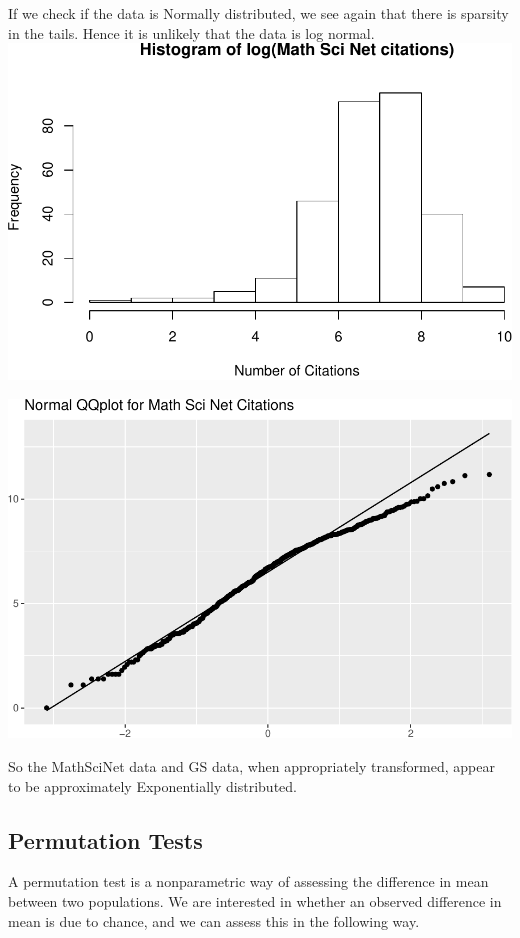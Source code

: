 \documentclass[]{article}
\begin{document}
If we check if the data is Normally distributed, we see again that there
is sparsity in the tails. Hence it is unlikely that the data is log
normal.
\includegraphics{final_files/figure-latex/unnamed-chunk-16-1.pdf}

\includegraphics{final_files/figure-latex/unnamed-chunk-17-1.pdf}

So the MathSciNet data and GS data, when appropriately transformed,
appear to be approximately Exponentially distributed.

\hypertarget{permutation-tests}{%
\subsection{Permutation Tests}\label{permutation-tests}}

A permutation test is a nonparametric way of assessing the difference in
mean between two populations. We are interested in whether an observed
difference in mean is due to chance, and we can assess this in the
following way.
\end{document}
